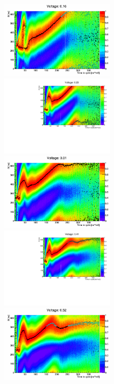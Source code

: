 \documentclass{paper}
\begin{document}
\begin{figure}
		\includegraphics[width=0.5\textwidth]{images/V=0_32_fitted_bpm_to_rf_deltas}
		\includegraphics[width=0.5\textwidth]{images/V=0_46_fitted_bpm_to_rf_deltas}
		\includegraphics[width=0.5\textwidth]{images/V=0_62_fitted_bpm_to_rf_deltas}
		\includegraphics[width=0.5\textwidth]{images/V=0_81_fitted_bpm_to_rf_deltas}
		\includegraphics[width=0.5\textwidth]{images/V=1_05_fitted_bpm_to_rf_deltas}

\end{figure}
\end{document}
